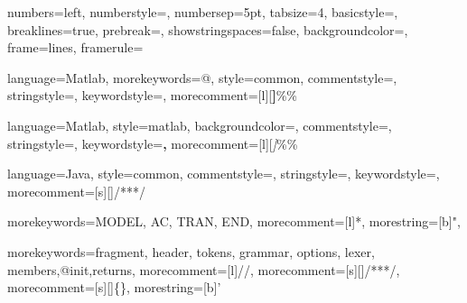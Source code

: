 \usepackage{listings}






{numbers=left,%
  numberstyle=\tiny,%
  numbersep=5pt,%
  tabsize=4,%
  basicstyle=\ttfamily\small,%
  breaklines=true,%
  prebreak={},%
  showstringspaces=false,%
  backgroundcolor=\color{codebackground},%
  frame=lines,
  framerule=\heavyrulewidth
}


{language=Matlab,%
  morekeywords={@},
  style=common,%
  commentstyle=\color{matlabComment},%
  stringstyle=\color{matlabString},%
  keywordstyle=\color{matlabKeyword},%
  morecomment=[l][\color{matlabCell}\textbf]{\%\%}}

{language=Matlab,%
  style=matlab,%
  backgroundcolor=\color{white},%
  commentstyle=\color{gray},%
  stringstyle=\color{darkgray},%
  keywordstyle=\color{black}\textbf,%
  morecomment=[l][\color{gray}\textit]{\%\%}}

{language=Java,%
  style=common,%
  commentstyle=\color{javaComment},%
  stringstyle=\color{javaString},%
  keywordstyle=\color{javaKeyword},%
  morecomment=[s][\color{javaDocstring}]{/**}{*/}
  }

{morekeywords={MODEL, AC, TRAN, END},
morecomment=[l]{*},
morestring=[b]",
}

{
  morekeywords={fragment, header, tokens, grammar, options, lexer, members,@init,returns},
  morecomment=[l]{//},
  morecomment=[s][\color{javaDocstring}]{/**}{*/},
  morecomment=[s][\color{antlrAction}]{\{}{\}},
  morestring=[b]'
}

